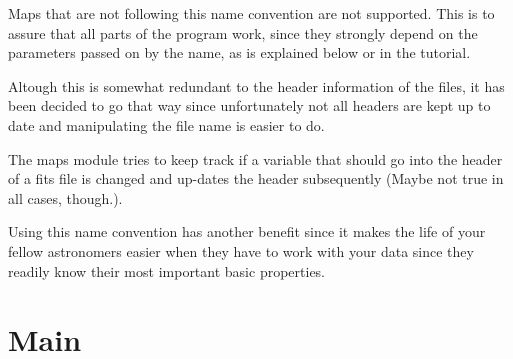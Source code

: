 \documentclass[a4paper,10pt,english]{sphinxmanual}
\begin{document}
Maps that are not following this name convention are not supported. This is
to assure that all parts of the program work, since they strongly depend on the
parameters passed on by the name, as is explained below or in the tutorial.

Altough this is somewhat redundant to the header information of the files, it 
has been decided to go that way since unfortunately not all headers are kept up
to date and manipulating the file name is easier to do.

The maps module tries to keep track if a variable that should go into the
header of a fits file is changed and up-dates the header subsequently (Maybe
not true in all cases, though.).

Using this name convention has another benefit since it makes the life of your
fellow astronomers easier when they have to work with your data since they
readily know their most important basic properties.


\section{Main}
\label{maps:main}
\end{document}
